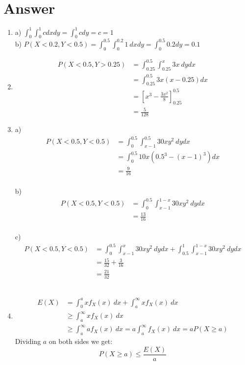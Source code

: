 \documentclass[11pt]{article}
\begin{document}
\section{Answer}
\begin{enumerate}
  \item a) $\int_{0}^{1} \int_{0}^{1} c dxdy = \int_{0}^{1} c dy = c = 1$ \\
  b) $P(X<0.2, Y<0.5) = \int_{0}^{0.5} \int_{0}^{0.2} 1 \: dxdy = \int_{0}^{0.5} 0.2 dy = 0.1$
  \item \begin{align*}
    P(X<0.5, Y>0.25) &= \int_{0.25}^{0.5} \int_{0.25}^{x} 3x \: dydx\\
    &= \int_{0.25}^{0.5} 3x(x-0.25) dx \\
    &= [x^3 - \frac{3x^2}{8}]_{0.25}^{0.5} \\
    &= \frac{5}{128}
  \end{align*}
  \item a)  \begin{align*}
    P(X<0.5, Y<0.5) &= \int_{0}^{0.5} \int_{x-1}^{0.5} 30xy^2 \: dydx\\
    &= \int_{0}^{0.5} 10x(0.5^3 - (x-1)^3) dx \\
    &= \frac{9}{16}
  \end{align*} \\
  b)  \begin{align*}
    P(X<0.5, Y<0.5) &= \int_{0}^{0.5} \int_{x-1}^{1-x} 30xy^2 \: dydx\\
    &= \frac{13}{16}
  \end{align*} \\
  c) \begin{align*}
    P(X<0.5, Y<0.5) &= \int_{0}^{0.5} \int_{x-1}^{x} 30xy^2 \: dydx + \int_{0.5}^{1} \int_{x-1}^{1-x} 30xy^2 \: dydx\\
    &= \frac{15}{32} + \frac{3}{16} \\
    &= \frac{21}{32}
  \end{align*} \\
  \item \begin{align*}
    E(X) &= \int_{0}^{a} xf_X(x) \: dx + \int_{a}^{\infty} xf_X(x) \: dx \\
    &\geq \int_{a}^{\infty} xf_X(x) \: dx \\
    &\geq \int_{a}^{\infty} af_X(x) \: dx = a\int_{a}^{\infty} f_X(x) \: dx = aP(X \geq a)
  \end{align*} 
  Dividing $a$ on both sides we get:
  $$P(X \geq a) \leq \frac{E(X)}{a}$$
\end{enumerate}
\end{document}
